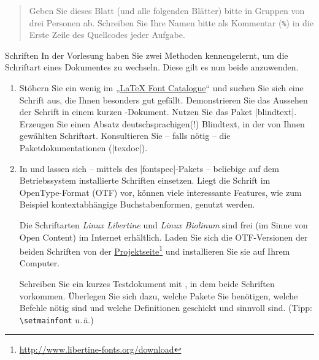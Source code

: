 \documentclass[
	vorläufig=false, 
	blattnr=1,
	ausgabe=2021-10-27,
	abgabe=2021-11-03,
	lösung=false,
	shortverb,
]{../tex/latexkurs-exercise}
\begin{document}
\begin{abstract}
	\noindent Geben Sie dieses Blatt (und alle folgenden Blätter) bitte in Gruppen von drei Personen ab. Schreiben Sie Ihre Namen bitte als Kommentar (\texttt{\%}) in die Erste Zeile des Quellcodes jeder Aufgabe.
\end{abstract}

\begin{aufgabe}[6]{Schriften}
	In der Vorlesung haben Sie zwei Methoden kennengelernt, um die Schriftart eines Dokumentes zu wechseln.
	Diese gilt es nun beide anzuwenden.
	\begin{enumerate}[label=\alph*)]
		\item Stöbern Sie ein wenig im „\href{http://www.tug.dk/FontCatalogue/}{LaTeX Font Catalogue}“ und suchen Sie sich eine Schrift aus, die Ihnen besonders gut gefällt. Demonstrieren Sie das Aussehen der Schrift in einem kurzen -Dokument. Nutzen Sie das Paket |blindtext|. Erzeugen Sie einen Absatz deutschsprachigen(!) Blindtext, in der von Ihnen gewählten Schriftart. Konsultieren Sie – falls nötig – die Paketdokumentationen (|texdoc|).
		\item In  und  lassen sich – mittels des |fontspec|-Pakets – beliebige auf dem Betriebssystem installierte Schriften einsetzen. Liegt die Schrift im OpenType-Format (OTF) vor, können viele interessante Features, wie zum Beispiel kontextabhängige Buchstabenformen, genutzt werden.
		
		Die Schriftarten \emph{Linux Libertine} und \emph{Linux Biolinum} sind frei (im Sinne von Open Content) im Internet erhältlich. Laden Sie sich die OTF-Versionen der beiden Schriften von der \href{http://libertine-fonts.org/download}{Projektseite}\footnote{\url{http://www.libertine-fonts.org/download}} und installieren Sie sie auf Ihrem Computer.
		
		Schreiben Sie ein kurzes Testdokument mit , in dem beide Schriften vorkommen. Überlegen Sie sich dazu, welche Pakete Sie benötigen, welche Befehle nötig sind und welche Definitionen geschickt und sinnvoll sind. (Tipp: \texttt{\textbackslash setmainfont} u.\,ä.)
	\end{enumerate}
\end{aufgabe}

\end{document}
